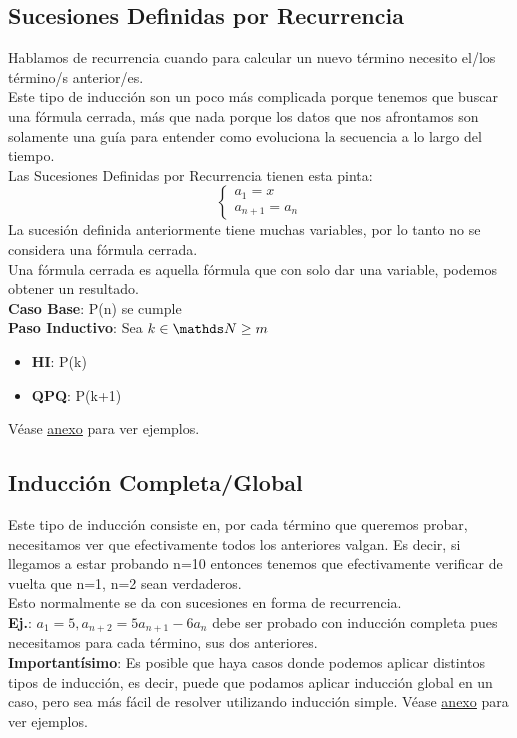 \documentclass[10pt,a4paper]{article}
\begin{document}
\subsection*{Sucesiones Definidas por Recurrencia}
Hablamos de recurrencia cuando para calcular un nuevo término necesito el/los término/s anterior/es.  \\
Este tipo de inducción son un poco más complicada porque tenemos que buscar una fórmula cerrada, más que nada porque los datos que nos afrontamos son solamente una guía para entender como evoluciona la secuencia a lo largo del tiempo. \\
Las Sucesiones Definidas por Recurrencia tienen esta pinta:
\[\left\{ \begin{array}{lcc} a_{1} = x  \\ a_{n+1} = a_{n} \end{array} \right.\]
La sucesión definida anteriormente tiene muchas variables, por lo tanto no se considera una fórmula cerrada.  \\
Una fórmula cerrada es aquella fórmula que con solo dar una variable, podemos obtener un resultado. \\
\textbf{Caso Base}: P(n) se cumple \\
\textbf{Paso Inductivo}: Sea $ k \in \nat\ge m $
\begin{itemize}
    \item \textbf{HI}: P(k)
    \item \textbf{QPQ}: P(k+1) 
\end{itemize}
Véase \hyperref[subsec:sucesiones_recurrencia]{\underline{anexo}} para ver ejemplos.
\subsection*{Inducción Completa/Global}
Este tipo de inducción consiste en, por cada término que queremos probar, necesitamos ver que efectivamente todos los anteriores valgan. Es decir, si llegamos a estar probando n=10 entonces tenemos que efectivamente verificar de vuelta que n=1, n=2 sean verdaderos. \\
Esto normalmente se da con sucesiones en forma de recurrencia. \\
\textbf{Ej.}: $ a_{1} = 5, a_{n+2} = 5a_{n+1} - 6a_{n}$ debe ser probado con inducción completa pues necesitamos para cada término, sus dos anteriores. \\
\textbf{Importantísimo}: Es posible que haya casos donde podemos aplicar distintos tipos de inducción, es decir, puede que podamos aplicar inducción global en un caso, pero sea más fácil de resolver utilizando inducción simple.
Véase \hyperref[subsec:induccion_completa]{\underline{anexo}} para ver ejemplos.
\end{document}
